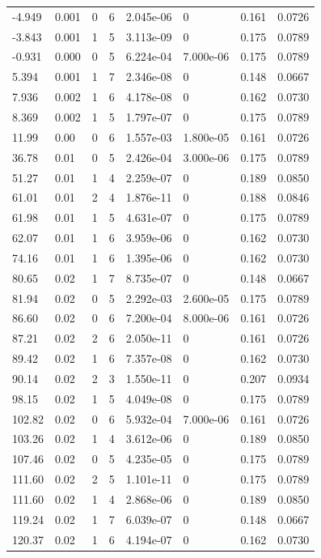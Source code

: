 \documentclass[preview]{standalone}
\begin{document}
{{\begin{tabular}{L{1.2cm}C{1.2cm} C{0.3cm}C{0.5cm} C{1.4cm}C{1.4cm} C{1.4cm}C{1.4cm}}
  -4.949  &  0.001  & 0     &  6 &  2.045e-06  & 0  & 0.161 &  0.0726   \\ 
  -3.843  &  0.001  & 1     &  5 &  3.113e-09  & 0  & 0.175 &  0.0789   \\ 
  -0.931  &  0.000  & 0     &  5 &  6.224e-04  & 7.000e-06  & 0.175 &  0.0789   \\ 
  5.394  &  0.001  & 1     &  7 &  2.346e-08  & 0  & 0.148 &  0.0667   \\ 
  7.936  &  0.002  & 1     &  6 &  4.178e-08  & 0  & 0.162 &  0.0730   \\ 
  8.369  &  0.002  & 1     &  5 &  1.797e-07  & 0  & 0.175 &  0.0789   \\ 
  11.99  &  0.00  & 0     &  6 &  1.557e-03  & 1.800e-05  & 0.161 &  0.0726   \\ 
  36.78  &  0.01  & 0     &  5 &  2.426e-04  & 3.000e-06  & 0.175 &  0.0789   \\ 
  51.27  &  0.01  & 1     &  4 &  2.259e-07  & 0  & 0.189 &  0.0850   \\ 
  61.01  &  0.01  & 2     &  4 &  1.876e-11  & 0  & 0.188 &  0.0846   \\ 
  61.98  &  0.01  & 1     &  5 &  4.631e-07  & 0  & 0.175 &  0.0789   \\ 
  62.07  &  0.01  & 1     &  6 &  3.959e-06  & 0  & 0.162 &  0.0730   \\ 
  74.16  &  0.01  & 1     &  6 &  1.395e-06  & 0  & 0.162 &  0.0730   \\ 
  80.65  &  0.02  & 1     &  7 &  8.735e-07  & 0  & 0.148 &  0.0667   \\ 
  81.94  &  0.02  & 0     &  5 &  2.292e-03  & 2.600e-05  & 0.175 &  0.0789   \\ 
  86.60  &  0.02  & 0     &  6 &  7.200e-04  & 8.000e-06  & 0.161 &  0.0726   \\ 
  87.21  &  0.02  & 2     &  6 &  2.050e-11  & 0  & 0.161 &  0.0726   \\ 
  89.42  &  0.02  & 1     &  6 &  7.357e-08  & 0  & 0.162 &  0.0730   \\ 
  90.14  &  0.02  & 2     &  3 &  1.550e-11  & 0  & 0.207 &  0.0934   \\ 
  98.15  &  0.02  & 1     &  5 &  4.049e-08  & 0  & 0.175 &  0.0789   \\ 
  102.82  &  0.02  & 0     &  6 &  5.932e-04  & 7.000e-06  & 0.161 &  0.0726   \\ 
  103.26  &  0.02  & 1     &  4 &  3.612e-06  & 0  & 0.189 &  0.0850   \\ 
  107.46  &  0.02  & 0     &  5 &  4.235e-05  & 0  & 0.175 &  0.0789   \\ 
  111.60  &  0.02  & 2     &  5 &  1.101e-11  & 0  & 0.175 &  0.0789   \\ 
  111.60  &  0.02  & 1     &  4 &  2.868e-06  & 0  & 0.189 &  0.0850   \\ 
  119.24  &  0.02  & 1     &  7 &  6.039e-07  & 0  & 0.148 &  0.0667   \\ 
  120.37  &  0.02  & 1     &  6 &  4.194e-07  & 0  & 0.162 &  0.0730   \\ 
\hline 
\end{tabular} 

}}
\end{document}
